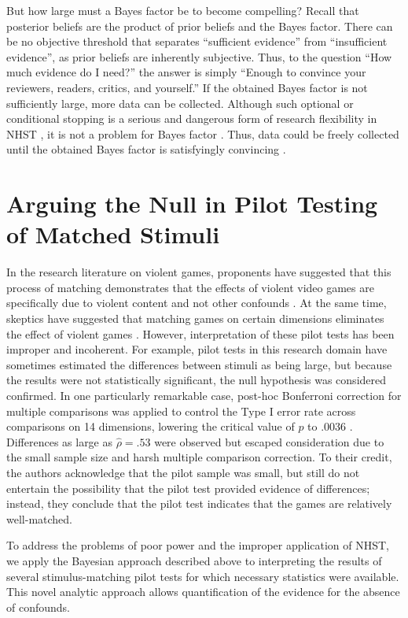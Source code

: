 \documentclass[man]{apa6}
\begin{document}
But how large must a Bayes factor be to become compelling? Recall that posterior beliefs are the product of prior beliefs and the Bayes factor. There can be no objective threshold that separates ``sufficient evidence'' from ``insufficient evidence'', as prior beliefs are inherently subjective. Thus, to the question ``How much evidence do I need?'' the answer is simply ``Enough to convince your reviewers, readers, critics, and yourself.'' 
If the obtained Bayes factor is not sufficiently large, more data can be collected. Although such optional or conditional stopping is a serious and dangerous form of research flexibility in NHST \citep{Simmons:etal:2011}, it is not a problem for Bayes factor \citep{Dienes:2011,Rouder:2014}. 
Thus, data could be freely collected until the obtained Bayes factor is satisfyingly convincing \citep[e.g.,][]{Matzke:etal:2015}.

\section{Arguing the Null in Pilot Testing of Matched Stimuli}
In the research literature on violent games, proponents have suggested that this process of matching demonstrates that the effects of violent video games are specifically due to violent content and not other confounds \citep{Anderson:etal:2004}. At the same time, skeptics have suggested that matching games on certain dimensions eliminates the effect of violent games \citep{Adachi:Willoughby:2011}. However, interpretation of these pilot tests has been improper and incoherent. For example, pilot tests in this research domain have sometimes estimated the differences between stimuli as being large, but because the results were not statistically significant, the null hypothesis was considered confirmed. In one particularly remarkable case, post-hoc Bonferroni correction for multiple comparisons was applied to control the Type I error rate across comparisons on 14 dimensions, lowering the critical value of $p$ to .0036 \citep{Arriaga:etal:2008}. Differences as large as $\hat{\rho} = .53$ were observed but escaped consideration due to the small sample size and harsh multiple comparison correction. To their credit, the authors acknowledge that the pilot sample was small, but still do not entertain the possibility that the pilot test provided evidence of differences; instead, they conclude that the pilot test indicates that the games are relatively well-matched.

To address the problems of poor power and the improper application of NHST, we apply the Bayesian approach described above to interpreting the results of several stimulus-matching pilot tests for which necessary statistics were available. This novel analytic approach allows quantification of the evidence for the absence of confounds. 
\end{document}
